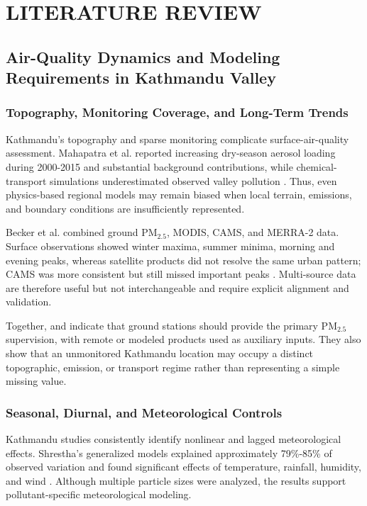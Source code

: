 \chapter{LITERATURE REVIEW}

\section{Air-Quality Dynamics and Modeling Requirements in Kathmandu Valley}

\subsection{Topography, Monitoring Coverage, and Long-Term Trends}

Kathmandu's topography and sparse monitoring complicate surface-air-quality assessment. Mahapatra et al. reported increasing dry-season aerosol loading during 2000-2015 and substantial background contributions, while chemical-transport simulations underestimated observed valley pollution \cite{ref1}. Thus, even physics-based regional models may remain biased when local terrain, emissions, and boundary conditions are insufficiently represented.

Becker et al. combined ground PM$_{2.5}$, MODIS, CAMS, and MERRA-2 data. Surface observations showed winter maxima, summer minima, morning and evening peaks, whereas satellite products did not resolve the same urban pattern; CAMS was more consistent but still missed important peaks \cite{ref2}. Multi-source data are therefore useful but not interchangeable and require explicit alignment and validation.

Together, \cite{ref1} and \cite{ref2} indicate that ground stations should provide the primary PM$_{2.5}$ supervision, with remote or modeled products used as auxiliary inputs. They also show that an unmonitored Kathmandu location may occupy a distinct topographic, emission, or transport regime rather than representing a simple missing value.

\subsection{Seasonal, Diurnal, and Meteorological Controls}

Kathmandu studies consistently identify nonlinear and lagged meteorological effects. Shrestha's generalized models explained approximately 79\%-85\% of observed variation and found significant effects of temperature, rainfall, humidity, and wind \cite{ref5}. Although multiple particle sizes were analyzed, the results support pollutant-specific meteorological modeling.

